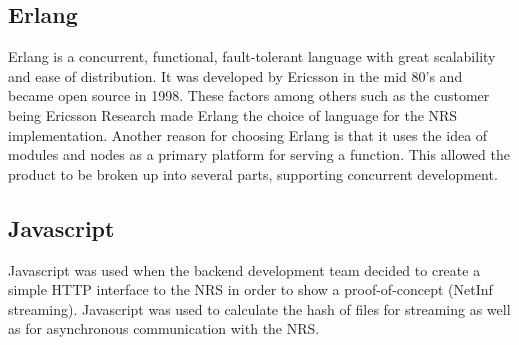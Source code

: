 \subsection{Erlang}
Erlang is a concurrent, functional, fault-tolerant language with great scalability and ease of distribution. It was developed by Ericsson in the mid 80's and became open source in 1998.\cite{otpInAction} These factors among others such as the customer being Ericsson Research made Erlang the choice of language for the NRS implementation.
Another reason for choosing Erlang is that it uses the idea of modules and nodes as a primary platform for serving a function. This allowed the product to be broken up into several parts, supporting concurrent development.
\subsection{Javascript}
Javascript \cite{javascript} was used when the backend development team decided to create a simple HTTP interface to the NRS in order to show a proof-of-concept (NetInf streaming). Javascript was used to calculate the hash of files for streaming as well as for asynchronous communication with the NRS.
